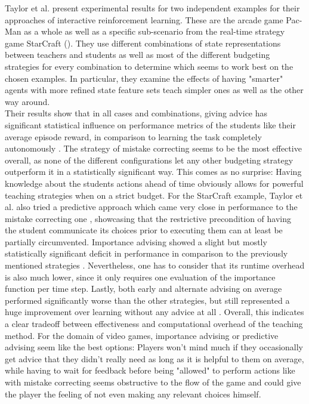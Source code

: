 \documentclass[12pt,twoside]{article}
\theoremstyle{plain}
\theoremstyle{definition}
\theoremstyle{remark}
\begin{document}
Taylor et al. present experimental results for two independent examples for their approaches of interactive reinforcement learning. These are the arcade game Pac-Man as a whole as well as a specific sub-scenario from the real-time strategy game StarCraft (\cite{Taylor2014reinforcement}). They use different combinations of state representations between teachers and students as well as most of the different budgeting strategies for every combination to determine which seems to work best on the chosen examples. In particular, they examine the effects of having "smarter" agents with more refined state feature sets teach simpler ones as well as the other way around. \\
Their results show that in all cases and combinations, giving advice has significant statistical influence on performance metrics of the students like their average episode reward, in comparison to learning the task completely autonomously \cite{Taylor2014reinforcement}. The strategy of mistake correcting seems to be the most effective overall, as none of the different configurations let any other budgeting strategy outperform it in a statistically significant way. This comes as no surprise: Having knowledge about the students actions ahead of time obviously allows for powerful teaching strategies when on a strict budget. For the StarCraft example, Taylor et al. also tried a predictive approach which came very close in performance to the mistake correcting one \cite{Taylor2014reinforcement}, showcasing that the restrictive precondition of having the student communicate its choices prior to executing them can at least be partially circumvented. Importance advising showed a slight but mostly statistically significant deficit in performance in comparison to the previously mentioned strategies \cite{Taylor2014reinforcement}. Nevertheless, one has to consider that its runtime overhead is also much lower, since it only requires one evaluation of the importance function per time step. Lastly, both early and alternate advising on average performed significantly worse than the other strategies, but still represented a huge improvement over learning without any advice at all \cite{Taylor2014reinforcement}. Overall, this indicates a clear tradeoff between effectiveness and computational overhead of the teaching method. For the domain of video games, importance advising or predictive advising seem like the best options: Players won't mind much if they occasionally get advice that they didn't really need as long as it is helpful to them on average, while having to wait for feedback before being "allowed" to perform actions like with mistake correcting seems obstructive to the flow of the game and could give the player the feeling of not even making any relevant choices himself.
\end{document}
